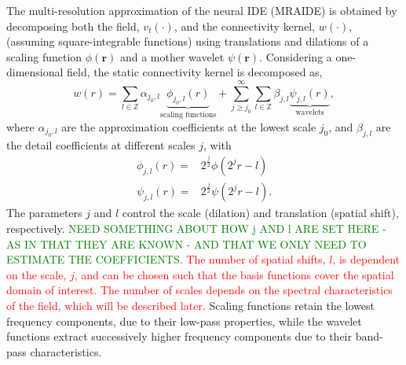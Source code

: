 \documentclass[review,authoryear,3p]{elsarticle}
\newcommand{\dean}[1]{\textcolor{green}{#1}}
\newcommand{\parham}[1]{\textcolor{red}{#1}}
\begin{document}
The multi-resolution approximation \citep{Mallat1989a} of the neural IDE (MRAIDE) is obtained by decomposing both the field, $v_t(\cdot)$, and the connectivity kernel, $w(\cdot)$, (assuming square-integrable functions) using translations and dilations of a scaling function $\phi(\mathbf{r})$ and a mother wavelet $\psi(\mathbf{r})$. Considering a  one-dimensional field, the static connectivity kernel is decomposed as,
\begin{equation}
 w\left(r\right)=\sum_{l\in \mathbb{Z}}\alpha_{j_0,l} \underbrace{\phi_{j_0,l}\left(r\right)}_{\text{scaling functions}} + \sum_{j\geq j_0}^{\infty} \sum_{l \in \mathbb{Z}}\beta_{j,l} \underbrace{\psi_{j,l}\left(r\right)}_{\text{wavelets}}, 
\label{eq:KernelExpansion}
\end{equation}
where $\alpha_{j_0,l}$ are the approximation coefficients at the lowest scale $j_0$, and $\beta_{j,l}$ are the detail coefficients at different scales $j$, with
\begin{align}
\phi_{j,l}\left(r\right) =& 2^{\frac{j}{2}}\phi\left(2^j r-l\right) \label{eq:generalscalingfinction}\\	
\psi_{j,l}\left(r\right) =& 2^{\frac{j}{2}}\psi\left(2^j r-l\right).  \label{eq:generalwaveletfinction}
\end{align}
The parameters $j$ and $l$ control the scale (dilation) and translation (spatial shift), respectively. \dean{NEED SOMETHING ABOUT HOW j AND l ARE SET HERE - AS IN THAT THEY ARE KNOWN - AND THAT WE ONLY NEED TO ESTIMATE THE COEFFICIENTS.} \parham{The number of spatial shifts, $l$, is dependent on the scale, $j$, and can be chosen such that the basis functions cover the spatial domain of interest. The number of scales depends on the spectral characteristics of the field, which will be described later.} Scaling functions retain the lowest frequency components, due to their low-pass properties, while the wavelet functions extract successively higher frequency components due to their band-pass characteristics. 
\end{document}
